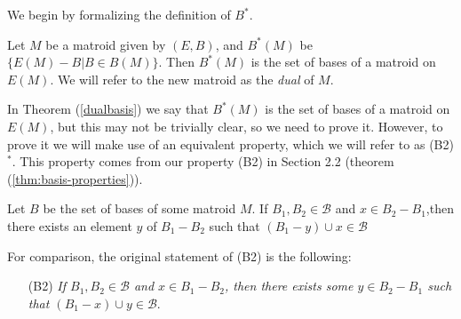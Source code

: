 

We begin by formalizing the definition of $B^*$.
\begin{theorem}\label{dualbasis}
    Let $M$ be a matroid given by $(E,B)$, and $B^*(M)$ be $\{E(M) - B|B\in B(M)\}$. Then $B^*(M)$ is the set of bases of a matroid on $E(M)$. We will refer to the new matroid as the \textit{dual} of $M$.
\end{theorem}


In Theorem (\ref{dualbasis}) we say that $B^*(M)$ is the set of bases of a matroid on $E(M)$, but this may not be trivially clear, so we need to prove it. However, to prove it we will make use of an equivalent property, which we will refer to as (B2)$^*$. This property comes from our property (B2) in Section 2.2 (theorem (\ref{thm:basis-properties})).

\begin{lemma}[(B2)$^*$]\label{B2Dual}
    Let $B$ be the set of bases of some matroid $M$. If $B_1, B_2 \in \mathcal{B}$ and $x \in B_2 - B_1$,then there exists an element $y$ of $B_1 - B_2$ such that $(B_1 - y) \cup x \in \mathcal{B}$
\end{lemma}

For comparison, the original statement of (B2) is the following:
\begin{enumerate}
    \item[(B2)] \textit{If $B_1,B_2\in \mathcal{B}$ and $x\in B_1 - B_2$, then there exists some $y\in B_2 - B_1$ such that $(B_1 - x)\cup y \in \mathcal{B}$}.
\end{enumerate}

